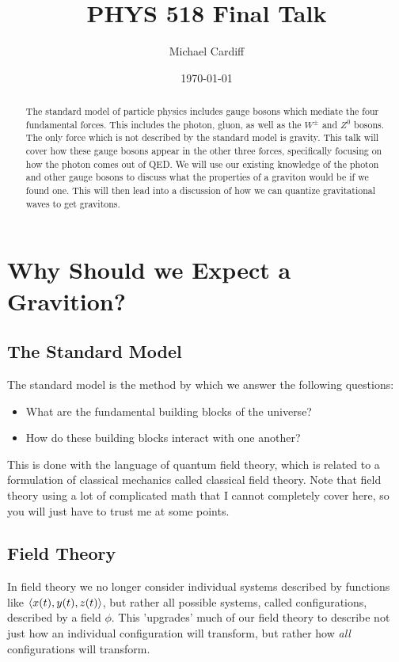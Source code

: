 \documentclass[12pt]{article}
\title{\vspace{-3em}PHYS 518 Final Talk}
\author{Michael Cardiff}
\date{\today}
\begin{document}
\maketitle
\begin{abstract}
  The standard model of particle physics includes gauge bosons which mediate the four fundamental forces. This includes the photon, gluon, as well as the $W^{\pm}$ and $Z^0$ bosons. The only force which is not described by the standard model is gravity. This talk will cover how these gauge bosons appear in the other three forces, specifically focusing on how the photon comes out of QED. We will use our existing knowledge of the photon and other gauge bosons to discuss what the properties of a graviton would be if we found one. This will then lead into a discussion of how we can quantize gravitational waves to get gravitons. 
\end{abstract}
\section{Why Should we Expect a Gravition?}
\subsection{The Standard Model}
The standard model is the method by which we answer the following questions:
\begin{itemize}
\item What are the fundamental building blocks of the universe?
\item How do these building blocks interact with one another?
\end{itemize}
This is done with the language of quantum field theory, which is related to a formulation of classical mechanics called classical field theory. Note that field theory using a lot of complicated math that I cannot completely cover here, so you will just have to trust me at some points.

\subsection{Field Theory}
In field theory we no longer consider individual systems described by functions like $\ev{x(t),y(t),z(t)}$, but rather all possible systems, called configurations, described by a field $\phi$. This 'upgrades' much of our field theory to describe not just how an individual configuration will transform, but rather how \emph{all} configurations will transform.
\end{document}
